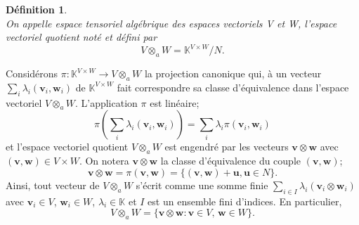 \documentclass[11pt,a4paper,oneside]{book}
\newtheorem{defi}{Définition}[chapter]
\def\K{\mathbb K}
\def\v{\mathbf v}
\def\u{\mathbf u}
\def\w{\mathbf w}
\begin{document}
\begin{defi}
\emph{\\}
On appelle espace tensoriel algébrique des espaces vectoriels V et W, l’espace vectoriel quotient noté et défini par
\begin{equation}\label{3.10}
V\otimes_{a} W=\K^{V\times W}/N.
\end{equation}
\end{defi}

Considérons $ \pi: \K^{V\times W}\rightarrow V\otimes_{a} W$ la projection canonique qui, à un vecteur $ \sum_{i}\lambda_{i}(\v_{i},\w_{i}) $ de $ \K^{V\times W} $ fait correspondre sa classe d'équivalence dans l'espace vectoriel $ V\otimes_{a} W $. L'application $ \pi $ est linéaire;
$$\pi\left(\sum_{i}\lambda_{i}(\v_{i},\w_{i})\right)=\sum_{i}\lambda_{i} \pi(\v_{i},\w_{i}) $$ et l'espace vectoriel quotient $V\otimes_{a} W $ est engendré par les vecteurs $ \v\otimes \w $ avec $ (\v,\w)\in V\times W $. On notera $ \v\otimes \w $ la classe d'équivalence du couple $ (\v,\w) $;
\begin{equation}
\v\otimes \w=\pi(\v,\w)=\{(\v,\w)+\u,\u\in N\}.
\end{equation}
Ainsi, tout vecteur de $V\otimes_{a} W $ s'écrit comme une somme finie $ \underset{i\in I}{\sum}\lambda_{i}(\v_{i}\otimes \w_{i}) $ avec $ \v_{i}\in V $, $ \w_{i}\in W $, $ \lambda_{i}\in\K $ et $ I $ est un ensemble fini d'indices. En particulier,
\begin{equation}
V\otimes_{a} W=\{\v\otimes \w : \v\in V,\, \w\in W\}.
\end{equation}
\end{document}
